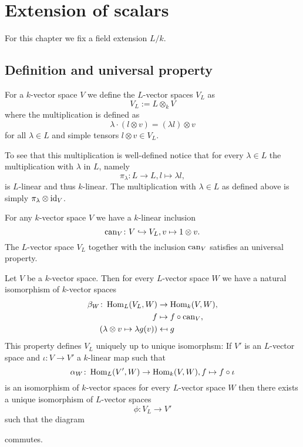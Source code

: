 \chapter{Extension of scalars}
For this chapter we fix a field extension $L/k$.




\section{Definition and universal property}


\begin{defi}
 For a $k$-vector space $V$ we define the $L$-vector spaces $V_L$ as
 \[
  V_L := L \otimes_k V
 \]
 where the multiplication is defined as
 \[
  \lambda \cdot (l \otimes v) = (\lambda l) \otimes v
 \]
 for all $\lambda \in L$ and simple tensors $l \otimes v \in V_L$.
\end{defi}

To see that this multiplication is well-defined notice that for every $\lambda \in L$ the multiplication with $\lambda$ in $L$, namely
\[
 \pi_\lambda \colon L \to L, l \mapsto \lambda l,
\]
is $L$-linear and thus $k$-linear. The multiplication with $\lambda \in L$ as defined above is simply $\pi_\lambda \otimes \operatorname{id}_V$.


For any $k$-vector space $V$ we have a $k$-linear inclusion
\[
 \operatorname{can}_V \colon V \hookrightarrow V_L, v \mapsto 1 \otimes v.
\]
The $L$-vector space $V_L$ together with the inclusion $\operatorname{can}_V$ satisfies an universal property.


\begin{thrm}
 Let $V$ be a $k$-vector space. Then for every $L$-vector space $W$ we have a natural isomorphism of $k$-vector spaces
 \begin{align*}
             \beta_W \colon \operatorname{Hom}_L(V_L, W) &\to \operatorname{Hom}_k(V,W), \\
                                         f &\mapsto f \circ \operatorname{can}_V, \\
  (\lambda \otimes v \mapsto \lambda g(v)) &\mapsfrom g
 \end{align*}
 This property defines $V_L$ uniquely up to unique isomorphsm: If $V'$ is an $L$-vector space and $\iota \colon V \to V'$ a $k$-linear map such that
 \[
  \alpha_W \colon \operatorname{Hom}_L(V', W) \to \operatorname{Hom}_k(V,W), f \mapsto f \circ \iota
 \]
 is an isomorphism of $k$-vector spaces for every $L$-vector space $W$ then there exists a unique isomorphism of $L$-vector spaces
 \[
  \phi \colon V_L \to V'
 \]
 such that the diagram
 \begin{center}
 \end{center}
 commutes.
\end{thrm}


